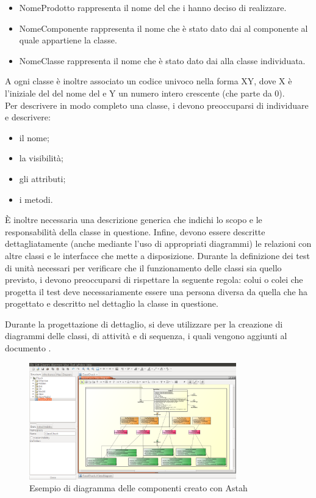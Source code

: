 					\begin{itemize}
						\item NomeProdotto rappresenta il nome del   che i  hanno deciso di realizzare.
						\item NomeComponente rappresenta il nome che è stato dato dai  al componente al quale appartiene la classe.
						\item NomeClasse rappresenta il nome che è stato dato dai  alla classe individuata.
					\end{itemize}
					A ogni classe è inoltre associato un codice univoco nella forma XY, dove X è l'iniziale del del nome del  e Y un numero intero crescente (che parte da 0).\\
					 \label{sec:DescrizioneClasse}
					Per descrivere in modo completo una classe, i  devono preoccuparsi di individuare e descrivere:
					\begin{itemize}
						\item il nome;
						\item la visibilità;
						\item gli attributi;
						\item i metodi.
					\end{itemize}
					È inoltre necessaria una descrizione generica che indichi lo scopo e le responsabilità della classe in questione. Infine, devono essere descritte dettagliatamente (anche mediante l'uso di appropriati diagrammi) le relazioni con altre classi e le interfacce che mette a disposizione.
					 \label{sec:TestUnita}
					Durante la definizione dei test di unità necessari per verificare che il funzionamento delle classi sia quello previsto, i  devono preoccuparsi di rispettare la seguente regola: colui o colei che progetta il test deve necessariamente essere una persona diversa da quella che ha progettato e descritto nel dettaglio la classe in questione.

				Durante la progettazione di dettaglio, si deve utilizzare  per la creazione di diagrammi delle classi, di attività e di sequenza, i quali vengono aggiunti al documento .
				\begin{figure}[H]
					\centering
					\includegraphics[width=0.8\textwidth]{NormeDiProgetto/Pics/ClassiAstah.png}
					\caption{Esempio di diagramma delle componenti creato con Astah}
				\end{figure}

